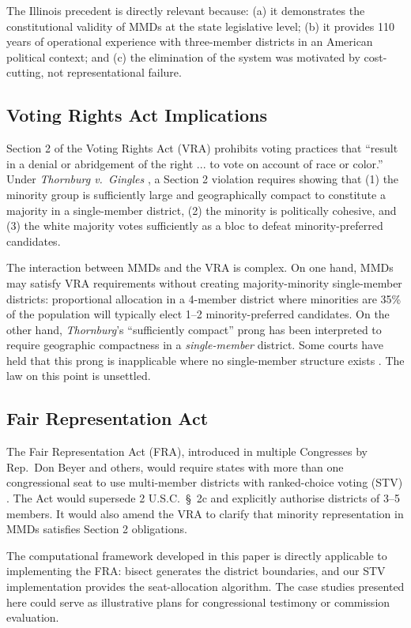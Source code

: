 The Illinois precedent is directly relevant because: (a) it demonstrates
the constitutional validity of MMDs at the state legislative level; (b) it
provides 110 years of operational experience with three-member districts in
an American political context; and (c) the elimination of the system was
motivated by cost-cutting, not representational failure.

\subsection{Voting Rights Act Implications}

Section 2 of the Voting Rights Act (VRA) prohibits voting practices that
``result in a denial or abridgement of the right ... to vote on account of
race or color.''  Under \emph{Thornburg v.\ Gingles} \citep{thornburg1986},
a Section 2 violation requires showing that (1) the minority group is
sufficiently large and geographically compact to constitute a majority in a
single-member district, (2) the minority is politically cohesive, and (3) the
white majority votes sufficiently as a bloc to defeat minority-preferred
candidates.

The interaction between MMDs and the VRA is complex.  On one hand, MMDs may
satisfy VRA requirements without creating majority-minority single-member
districts: proportional allocation in a 4-member district where minorities
are 35\% of the population will typically elect 1--2 minority-preferred
candidates.  On the other hand, \emph{Thornburg}'s ``sufficiently compact''
prong has been interpreted to require geographic compactness in a
\emph{single-member} district.  Some courts have held that this prong is
inapplicable where no single-member structure exists \citep{vra_mmd_review}.
The law on this point is unsettled.

\subsection{Fair Representation Act}

The Fair Representation Act (FRA), introduced in multiple Congresses by
Rep.\ Don Beyer and others, would require states with more than one
congressional seat to use multi-member districts with ranked-choice voting
(STV) \citep{fair_rep_act_2019}.  The Act would supersede 2 U.S.C.\ \S~2c
and explicitly authorise districts of 3--5 members.  It would also amend
the VRA to clarify that minority representation in MMDs satisfies Section 2
obligations.

The computational framework developed in this paper is directly applicable
to implementing the FRA: bisect generates the district boundaries, and our
STV implementation provides the seat-allocation algorithm.  The case studies
presented here could serve as illustrative plans for congressional testimony
or commission evaluation.

